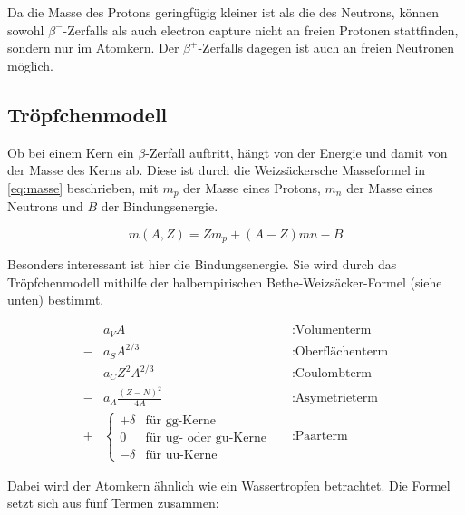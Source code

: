 Da die Masse des Protons geringfügig kleiner ist als die des Neutrons, können sowohl $\beta^-$-Zerfalls als auch electron capture nicht an freien Protonen stattfinden, sondern nur im Atomkern. Der $\beta^+$-Zerfalls dagegen ist auch an freien Neutronen möglich.

\subsection{Tröpfchenmodell}
Ob bei einem Kern ein $\beta$-Zerfall auftritt, hängt von der Energie und damit von der Masse des Kerns ab. Diese ist durch die Weizsäckersche Masseformel in \cref{eq:masse} beschrieben, mit $m_p$ der Masse eines Protons, $m_n$ der Masse eines Neutrons und $B$ der Bindungsenergie.

\begin{equation}
	m(A,Z) = Zm_p + (A-Z)mn-B
	\label{eq:masse}
\end{equation}

Besonders interessant ist hier die Bindungsenergie. Sie wird durch das Tröpfchenmodell mithilfe der halbempirischen Bethe-Weizsäcker-Formel (siehe unten) bestimmt.

\begin{align*}
	&a_V A  &&:\text{Volumenterm}\\
	-&a_S A^{2/3} &&:\text{Oberflächenterm}\\
	-&a_C Z^2 A^{2/3} &&:\text{Coulombterm}\\
	-&a_A \frac{(Z-N)^2}{4A} &&:\text{Asymetrieterm}\\
	+&\begin{cases}
		+\delta  &\text{für gg-Kerne}\\
		0 &\text{für ug- oder gu-Kerne} \\
		-\delta &\text{für uu-Kerne} 
	\end{cases}&&:\text{Paarterm}
\end{align*}

Dabei wird der Atomkern ähnlich wie ein Wassertropfen betrachtet. Die Formel setzt sich aus fünf Termen zusammen:

